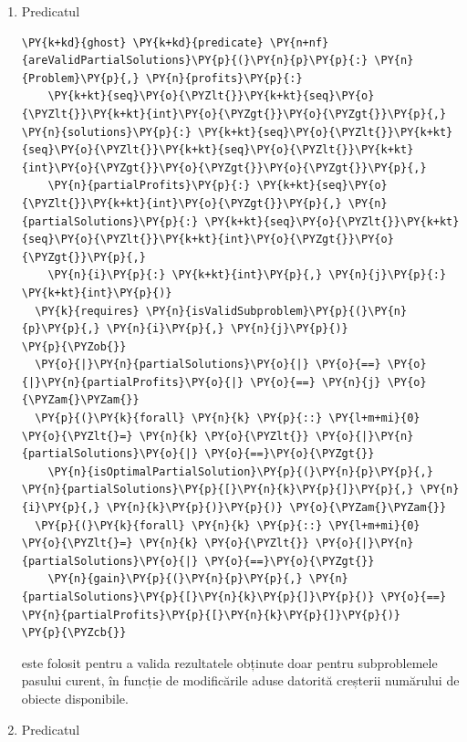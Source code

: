 \begin{sloppypar}
\begin{enumerate}
\begin{Verbatim}[commandchars=\\\{\}]
\PY{p}{\PYZcb{}}
\end{Verbatim}
    este folosit pentru a defini o subproblemă a problemei inițiale.
    \item Predicatul 
    \begin{Verbatim}[commandchars=\\\{\}]
\PY{k+kd}{ghost} \PY{k+kd}{predicate} \PY{n+nf}{areValidPartialSolutions}\PY{p}{(}\PY{n}{p}\PY{p}{:} \PY{n}{Problem}\PY{p}{,} \PY{n}{profits}\PY{p}{:} 
    \PY{k+kt}{seq}\PY{o}{\PYZlt{}}\PY{k+kt}{seq}\PY{o}{\PYZlt{}}\PY{k+kt}{int}\PY{o}{\PYZgt{}}\PY{o}{\PYZgt{}}\PY{p}{,} \PY{n}{solutions}\PY{p}{:} \PY{k+kt}{seq}\PY{o}{\PYZlt{}}\PY{k+kt}{seq}\PY{o}{\PYZlt{}}\PY{k+kt}{seq}\PY{o}{\PYZlt{}}\PY{k+kt}{int}\PY{o}{\PYZgt{}}\PY{o}{\PYZgt{}}\PY{o}{\PYZgt{}}\PY{p}{,} 
    \PY{n}{partialProfits}\PY{p}{:} \PY{k+kt}{seq}\PY{o}{\PYZlt{}}\PY{k+kt}{int}\PY{o}{\PYZgt{}}\PY{p}{,} \PY{n}{partialSolutions}\PY{p}{:} \PY{k+kt}{seq}\PY{o}{\PYZlt{}}\PY{k+kt}{seq}\PY{o}{\PYZlt{}}\PY{k+kt}{int}\PY{o}{\PYZgt{}}\PY{o}{\PYZgt{}}\PY{p}{,} 
    \PY{n}{i}\PY{p}{:} \PY{k+kt}{int}\PY{p}{,} \PY{n}{j}\PY{p}{:} \PY{k+kt}{int}\PY{p}{)}    
  \PY{k}{requires} \PY{n}{isValidSubproblem}\PY{p}{(}\PY{n}{p}\PY{p}{,} \PY{n}{i}\PY{p}{,} \PY{n}{j}\PY{p}{)}
\PY{p}{\PYZob{}}
  \PY{o}{|}\PY{n}{partialSolutions}\PY{o}{|} \PY{o}{==} \PY{o}{|}\PY{n}{partialProfits}\PY{o}{|} \PY{o}{==} \PY{n}{j} \PY{o}{\PYZam{}\PYZam{}} 
  \PY{p}{(}\PY{k}{forall} \PY{n}{k} \PY{p}{::} \PY{l+m+mi}{0} \PY{o}{\PYZlt{}=} \PY{n}{k} \PY{o}{\PYZlt{}} \PY{o}{|}\PY{n}{partialSolutions}\PY{o}{|} \PY{o}{==}\PY{o}{\PYZgt{}} 
    \PY{n}{isOptimalPartialSolution}\PY{p}{(}\PY{n}{p}\PY{p}{,} \PY{n}{partialSolutions}\PY{p}{[}\PY{n}{k}\PY{p}{]}\PY{p}{,} \PY{n}{i}\PY{p}{,} \PY{n}{k}\PY{p}{)}\PY{p}{)} \PY{o}{\PYZam{}\PYZam{}} 
  \PY{p}{(}\PY{k}{forall} \PY{n}{k} \PY{p}{::} \PY{l+m+mi}{0} \PY{o}{\PYZlt{}=} \PY{n}{k} \PY{o}{\PYZlt{}} \PY{o}{|}\PY{n}{partialSolutions}\PY{o}{|} \PY{o}{==}\PY{o}{\PYZgt{}} 
    \PY{n}{gain}\PY{p}{(}\PY{n}{p}\PY{p}{,} \PY{n}{partialSolutions}\PY{p}{[}\PY{n}{k}\PY{p}{]}\PY{p}{)} \PY{o}{==} \PY{n}{partialProfits}\PY{p}{[}\PY{n}{k}\PY{p}{]}\PY{p}{)}
\PY{p}{\PYZcb{}}
\end{Verbatim}
    este folosit pentru a valida rezultatele obținute doar pentru subproblemele pasului curent, în funcție de modificările aduse datorită creșterii numărului de obiecte disponibile.
    \item Predicatul 
    \begin{Verbatim}[commandchars=\\\{\}]

\end{Verbatim}
\end{enumerate}
\end{sloppypar}
